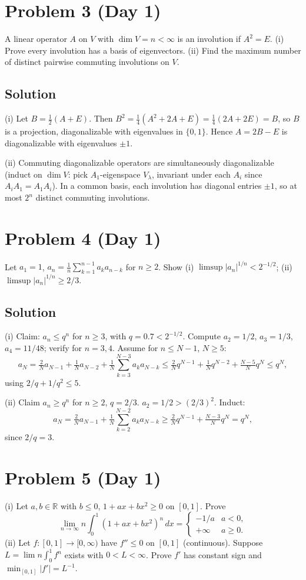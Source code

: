 \documentclass{article}
\begin{document}
\section*{Problem 3 (Day 1)}
A linear operator $A$ on $V$ with $\dim V = n < \infty$ is an involution if $A^2 = E$.
(i) Prove every involution has a basis of eigenvectors.
(ii) Find the maximum number of distinct pairwise commuting involutions on $V$.

\subsection*{Solution}
(i) Let $B = \tfrac12(A+E)$. Then $B^2 = \tfrac14(A^2 + 2A + E) = \tfrac14(2A+2E) = B$, so $B$ is a projection, diagonalizable with eigenvalues in $\{0,1\}$. Hence $A = 2B - E$ is diagonalizable with eigenvalues $\pm 1$.

(ii) Commuting diagonalizable operators are simultaneously diagonalizable (induct on $\dim V$: pick $A_1$-eigenspace $V_\lambda$, invariant under each $A_i$ since $A_i A_1 = A_1 A_i$). In a common basis, each involution has diagonal entries $\pm 1$, so at most $2^n$ distinct commuting involutions.

\section*{Problem 4 (Day 1)}
Let $a_1 = 1$, $a_n = \frac{1}{n}\sum_{k=1}^{n-1} a_k a_{n-k}$ for $n \geq 2$. Show
(i) $\limsup |a_n|^{1/n} < 2^{-1/2}$;
(ii) $\limsup |a_n|^{1/n} \geq 2/3$.

\subsection*{Solution}
(i) Claim: $a_n \leq q^n$ for $n \geq 3$, with $q = 0.7 < 2^{-1/2}$. Compute $a_2 = 1/2$, $a_3 = 1/3$, $a_4 = 11/48$; verify for $n = 3, 4$. Assume for $n \leq N-1$, $N \geq 5$:
\[
a_N = \tfrac{2}{N}a_{N-1} + \tfrac{1}{N}a_{N-2} + \tfrac{1}{N}\sum_{k=3}^{N-3} a_k a_{N-k}
\leq \tfrac{2}{N}q^{N-1} + \tfrac{1}{N}q^{N-2} + \tfrac{N-5}{N}q^N \leq q^N,
\]
using $2/q + 1/q^2 \leq 5$.

(ii) Claim $a_n \geq q^n$ for $n \geq 2$, $q = 2/3$. $a_2 = 1/2 > (2/3)^2$. Induct:
\[
a_N = \tfrac{2}{N}a_{N-1} + \tfrac{1}{N}\sum_{k=2}^{N-2} a_k a_{N-k} \geq \tfrac{2}{N}q^{N-1} + \tfrac{N-3}{N}q^N = q^N,
\]
since $2/q = 3$.

\section*{Problem 5 (Day 1)}
(i) Let $a, b \in \mathbb{R}$ with $b \leq 0$, $1 + ax + bx^2 \geq 0$ on $[0,1]$. Prove
\[
\lim_{n\to\infty} n \int_0^1 (1+ax+bx^2)^n\,dx = \begin{cases} -1/a & a < 0, \\ +\infty & a \geq 0. \end{cases}
\]
(ii) Let $f:[0,1]\to[0,\infty)$ have $f'' \leq 0$ on $[0,1]$ (continuous). Suppose $L = \lim n\int_0^1 f^n$ exists with $0 < L < \infty$. Prove $f'$ has constant sign and $\min_{[0,1]}|f'| = L^{-1}$.
\end{document}
